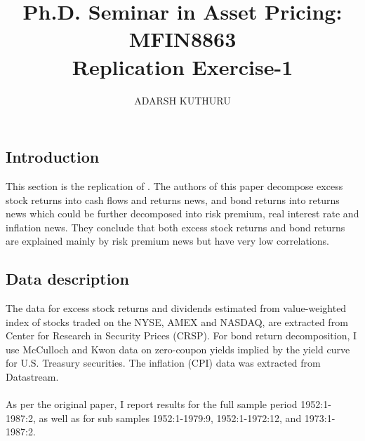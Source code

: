 \documentclass[11pt]{article}
\title{\Large \bf Ph.D. Seminar in Asset Pricing: MFIN8863 \\
Replication Exercise-1}
\author{ADARSH KUTHURU}
\date{\parbox{\linewidth}{\centering%
  \today\endgraf\bigskip
  \endgraf\medskip
  PhD Student in Finance \endgraf
  Boston College, United States}}
\begin{document}
\maketitle
\thispagestyle{empty}
\bigskip
\clearpage
\tableofcontents

\onehalfspacing      %
\renewcommand{\footnote}{\endnote}  %

\clearpage



\section{\cite{campbell1993moves}} \label{sec:CA}

\subsection{Introduction}
This section is the replication of \cite{campbell1993moves}. The authors of this paper decompose excess stock returns into cash flows and returns news, and bond returns into returns news which could be further decomposed into risk premium, real interest rate and inflation news. They conclude that both excess stock returns and bond returns are explained mainly by risk premium news but have very low correlations. 

\subsection{Data description}
The data for excess stock returns and dividends estimated from value-weighted index of stocks traded on the NYSE, AMEX and NASDAQ, are extracted from Center for Research in Security Prices (CRSP). For bond return decomposition, I use McCulloch and Kwon data on zero-coupon yields implied by the yield curve for U.S. Treasury securities. The inflation (CPI) data was extracted from Datastream.

\paragraph{ } As per the original paper, I report results for the full sample period
1952:1-1987:2, as well as for sub samples 1952:1-1979:9, 1952:1-1972:12,
and 1973:1-1987:2. 
\end{document}
